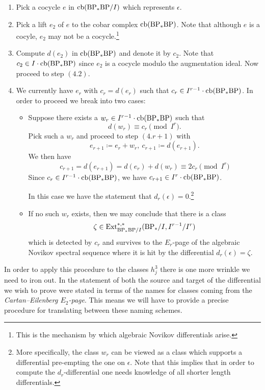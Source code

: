 \begin{enumerate}
\item Pick a cocycle $e$ in $\mathrm{cb}(\mathrm{BP}_*\mathrm{BP}/I)$ which represents $\epsilon$.
\item Pick a lift $e_2$ of $e$ to the cobar complex $\mathrm{cb}(\mathrm{BP}_*\mathrm{BP})$. Note that although $e$ is a cocyle, $e_2$ may not be a cocycle.\footnote{This is the mechanism by which algebraic Novikov differentials arise.}
\item Compute $d(e_2)$ in $\mathrm{cb}(\mathrm{BP}_*\mathrm{BP})$ and denote it by $c_2$. Note that $c_2 \in I \cdot \mathrm{cb}(\mathrm{BP}_*\mathrm{BP})$ since $e_2$ is a cocycle modulo the augmentation ideal. Now proceed to step $(4.2)$. 
\item[(4.r)] We currently have $e_r$ with $c_r = d(e_r)$ such that $c_r \in I^{r-1} \cdot \mathrm{cb}(\mathrm{BP}_*\mathrm{BP})$.
  In order to proceed we break into two cases:
  \begin{itemize}
  \item Suppose there exists a $w_r \in I^{r-1} \cdot \mathrm{cb}(\mathrm{BP}_*\mathrm{BP})$ such that
    \[ d(w_r) \equiv c_r \pmod{I^{r}}. \]
    Pick such a $w_r$ and proceed to step $(4.r+1)$ with 
    $$e_{r+1} \coloneqq e_r + w_r, \ c_{r+1} \coloneqq d(e_{r+1}).$$ 
    We then have
   $$c_{r+1}  = d(e_{r+1}) = d(e_r) + d(w_r) \equiv 2c_r \pmod{I^{r}}$$ 
Since $c_r \in I^{r-1} \cdot \mathrm{cb}(\mathrm{BP}_*\mathrm{BP})$, we have $c_{r+1} \in I^{r} \cdot \mathrm{cb}(\mathrm{BP}_*\mathrm{BP})$.   

  In this case we have the statement that $d_r(\epsilon) = 0$.\footnote{More specifically, the class $w_r$ can be viewed as a class which supports a differential pre-empting the one on $\epsilon$. Note that this implies that in order to compute the $d_r$-differential one needs knowledge of all shorter length differentials.}
  \item If no such $w_r$ exists, then we may conclude that there is a class
    \[ \zeta \in \operatorname{\mathrm{Ext}}_{\mathrm{BP}_*\mathrm{BP}/I}^{*,*}(\mathrm{BP}_*/I, I^{r-1}/I^{r}) \]
    which is detected by $c_r$ and survives to the $E_r$-page of the algebraic Novikov spectral sequence where it is hit by the differential $d_r(\epsilon) = \zeta$.
  \end{itemize}
\end{enumerate}




In order to apply this procedure to the classes $h_j^3$ there is one more wrinkle we need to iron out. In the statement of  both the source and target of the differential we wish to prove were stated in terms of the names for classes coming from the \emph{Cartan--Eilenberg $E_2$-page}. This means we will have to provide a precise procedure for translating between these naming schemes.

